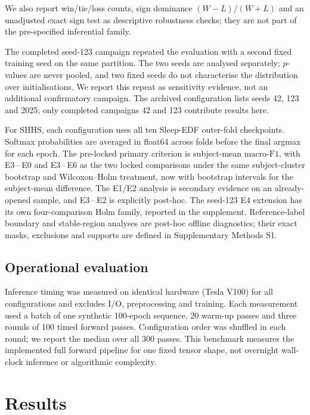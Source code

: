 \documentclass[11pt,a4paper]{article}
\newcommand{\mf}{\ensuremath{\mathrm{macro\text{-}F1}}}
\begin{document}
We also report win/tie/loss counts, sign dominance $(W-L)/(W+L)$ and an unadjusted exact sign test as
descriptive robustness checks; they are not part of the pre-specified inferential family.

The completed seed-123 campaign repeated the evaluation with a second fixed training seed on the
same partition. The two seeds are analysed separately; $p$-values are never pooled,
and two fixed seeds do not characterise the distribution over initialisations. We report this repeat
as sensitivity evidence, not an additional confirmatory campaign. The archived configuration lists
seeds 42, 123 and 2025; only completed campaigns 42 and 123 contribute results here.

For SHHS, each configuration uses all ten Sleep-EDF outer-fold checkpoints. Softmax probabilities are
averaged in float64 across folds before the final argmax for each epoch. The pre-locked primary criterion
is subject-mean \mf, with E3\,--\,E0 and E3\,--\,E6 as the two locked comparisons under the same
subject-cluster bootstrap and Wilcoxon--Holm treatment, now with bootstrap intervals for the
subject-mean difference. The E1/E2 analysis is secondary evidence on an already-opened sample,
and E3\,--\,E2 is explicitly post-hoc. The seed-123 E4 extension has its own four-comparison Holm
family, reported in the supplement. Reference-label boundary and stable-region analyses are post-hoc
offline diagnostics; their exact masks, exclusions and supports are defined in Supplementary Methods S1.

\subsection{Operational evaluation}

Inference timing was measured on identical hardware (Tesla V100) for all configurations and excludes
I/O, preprocessing and training. Each measurement used a batch of one synthetic 100-epoch sequence,
20 warm-up passes and three rounds of 100 timed forward passes. Configuration order was shuffled in
each round; we report the median over all 300 passes. This benchmark measures the implemented full
forward pipeline for one fixed tensor shape, not overnight wall-clock inference or algorithmic
complexity.

\section{Results}
\end{document}
